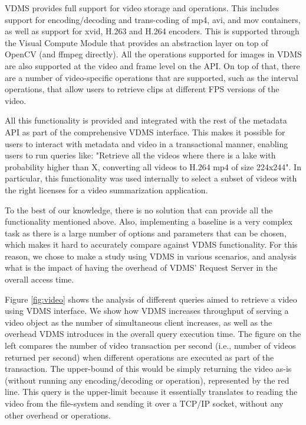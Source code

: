 VDMS provides full support for video storage and operations.
This includes support for encoding/decoding and trans-coding of mp4, avi, and
mov containers, as well as support for xvid, H.263 and H.264 encoders.
This is supported through the Visual Compute Module that provides an abstraction
layer on top of OpenCV (and ffmpeg directly).
All the operations supported for images in VDMS are also supported at the
video and frame level on the API. On top of that, there are a number of
video-specific operations that are supported, such as the interval operations,
that allow users to retrieve clips at different FPS versions of the video.

All this functionality is provided and integrated with the rest of the
metadata API as part of the comprehensive VDMS interface. This makes it
possible for users to interact with metadata and video in a transactional
manner, enabling users to run queries like: "Retrieve all the videos
where there is a lake with probability higher than X, converting all videos
to H.264 mp4 of size 224x244".
In particular, this functionality was used internally to select a subset
of videos with the right licenses for a video summarization application.

To the best of our knowledge, there is no solution that can provide
all the functionality mentioned above. Also, implementing a baseline is a very
complex task as there is a large number of options and parameters that can
be chosen, which makes it hard to accurately compare against VDMS functionality.
For this reason, we chose to make a study using VDMS in various scenarios,
and analysis what is the impact of having the overhead of VDMS' Request
Server in the overall access time.

Figure \ref{fig:video} shows the analysis of different queries aimed to retrieve
a video using VDMS interface. We show how VDMS increases throughput of serving
a video object as the number of simultaneous client increases, as well as the
overhead VDMS introduces in the overall query execution time.
The figure on the left compares the number of video transaction per second
(i.e., number of videos returned per second) when different operations
are executed as part of the transaction. The upper-bound of this would be
simply returning the video as-is (without running any encoding/decoding or
operation), represented by the red line. This query is the upper-limit because
it essentially translates to reading the video from the file-system and sending
it over a TCP/IP socket, without any other overhead or operations.

